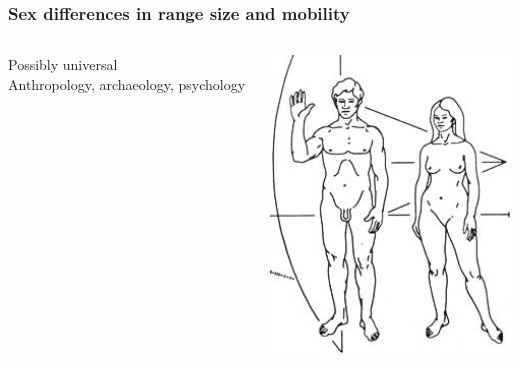 \documentclass{beamer}
\begin{document}
\begin{frame}
\frametitle{Sex differences in range size and mobility}

\begin{columns}
\begin{column}{.5\textwidth}

Possibly universal \\
\vspace{0.75cm}
Anthropology, archaeology, psychology \\

\end{column}

\begin{column}{.5\textwidth}
\includegraphics[width= 1\textwidth]{hum_di}
\end{column}

\end{columns}

\end{frame}

\end{document}

